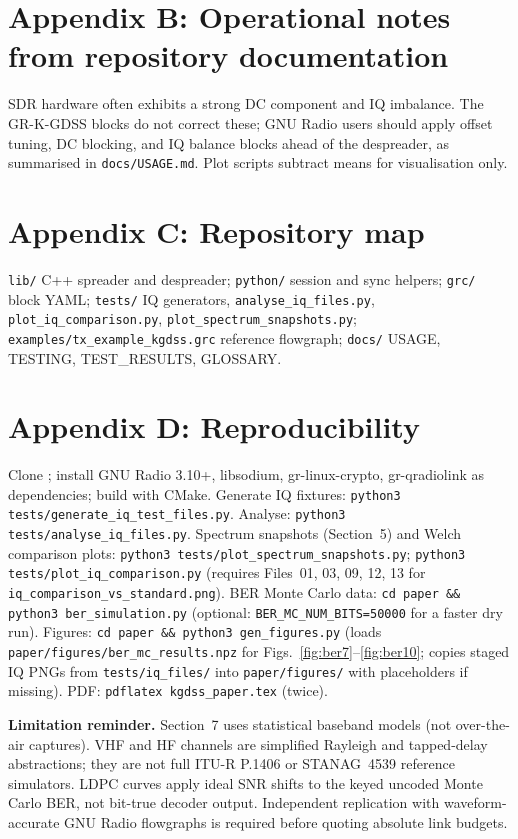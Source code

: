 \documentclass[10pt,a4paper,twocolumn]{article}
\begin{document}
\section*{Appendix B: Operational notes from repository documentation}
SDR hardware often exhibits a strong DC component and IQ imbalance. The GR-K-GDSS blocks do not correct these; GNU Radio users should apply offset tuning, DC blocking, and IQ balance blocks ahead of the despreader, as summarised in \texttt{docs/USAGE.md}. Plot scripts subtract means for visualisation only.

\section*{Appendix C: Repository map}
\texttt{lib/} C++ spreader and despreader; \texttt{python/} session and sync helpers; \texttt{grc/} block YAML; \texttt{tests/} IQ generators, \texttt{analyse\_iq\_files.py}, \texttt{plot\_iq\_comparison.py}, \texttt{plot\_spectrum\_snapshots.py}; \texttt{examples/tx\_example\_kgdss.grc} reference flowgraph; \texttt{docs/} USAGE, TESTING, TEST\_RESULTS, GLOSSARY.

\section*{Appendix D: Reproducibility}
Clone \cite{repo_gdss}; install GNU Radio 3.10+, libsodium, gr-linux-crypto, gr-qradiolink as dependencies; build with CMake. Generate IQ fixtures: \texttt{python3 tests/generate\_iq\_test\_files.py}. Analyse: \texttt{python3 tests/analyse\_iq\_files.py}. Spectrum snapshots (Section~5) and Welch comparison plots: \texttt{python3 tests/plot\_spectrum\_snapshots.py}; \texttt{python3 tests/plot\_iq\_comparison.py} (requires Files~01, 03, 09, 12, 13 for \texttt{iq\_comparison\_vs\_standard.png}). BER Monte Carlo data: \texttt{cd paper \&\& python3 ber\_simulation.py} (optional: \texttt{BER\_MC\_NUM\_BITS=50000} for a faster dry run). Figures: \texttt{cd paper \&\& python3 gen\_figures.py} (loads \texttt{paper/figures/ber\_mc\_results.npz} for Figs.~\ref{fig:ber7}--\ref{fig:ber10}; copies staged IQ PNGs from \texttt{tests/iq\_files/} into \texttt{paper/figures/} with placeholders if missing). PDF: \texttt{pdflatex kgdss\_paper.tex} (twice).

\vspace{1em}
\noindent\textbf{Limitation reminder.} Section~7 uses statistical baseband models (not over-the-air captures). VHF and HF channels are simplified Rayleigh and tapped-delay abstractions; they are not full ITU-R P.1406 or STANAG~4539 reference simulators. LDPC curves apply ideal SNR shifts to the keyed uncoded Monte Carlo BER, not bit-true decoder output. Independent replication with waveform-accurate GNU Radio flowgraphs is required before quoting absolute link budgets.
\end{document}
